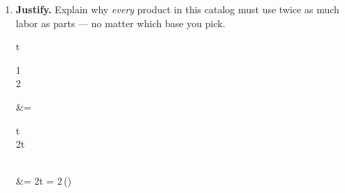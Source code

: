 \documentclass[10pt]{article}
\begin{document}
\begin{tcolorbox}[colback=white, colframe=black!40, title=\textbf{Tier E --- Extension},
    fonttitle=\bfseries, arc=1.5mm, left=3mm, right=3mm, top=2mm, bottom=2mm, breakable]
\begin{enumerate}[leftmargin=1.7em, itemsep=8pt]
\begin{work}
\end{work}
  \item \textbf{Justify.} Explain why \emph{every} product in this catalog must use twice as much
        labor as parts --- no matter which base you pick.
\begin{work}
  t\begin{bsmallmatrix} 1\\2 \end{bsmallmatrix} &= \begin{bsmallmatrix} t\\2t \end{bsmallmatrix} \\
   &= 2t = 2\,()
\end{work}
\end{enumerate}
\end{tcolorbox}
\end{document}
